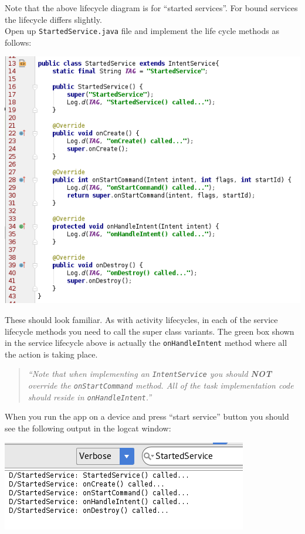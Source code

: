 Note that the above lifecycle diagram is for ``started services''. For bound services the lifecycle differs slightly. \\

Open up \texttt{StartedService.java} file and implement the life cycle methods as follows:

\begin{center}
	\includegraphics[scale=\SourceCodeScale]{chapters/ch14/images/10}
\end{center}

These should look familiar. As with activity lifecycles, in each of the  service lifecycle methods you need to call the super class variants. The green box shown in the service lifecycle above is actually the \texttt{onHandleIntent} method where all the action is taking place. 

\begin{quote}
	\textit{``Note that when implementing an \texttt{IntentService} you should \textbf{NOT} override the \texttt{onStartCommand} method. All of the task implementation code should reside in \texttt{onHandleIntent}.''}
\end{quote}

When you run the app on a device and press ``start service'' button you should see the following output in the logcat window:

\begin{center}
	\includegraphics[scale=\SourceCodeScale]{chapters/ch14/images/11}
\end{center}

